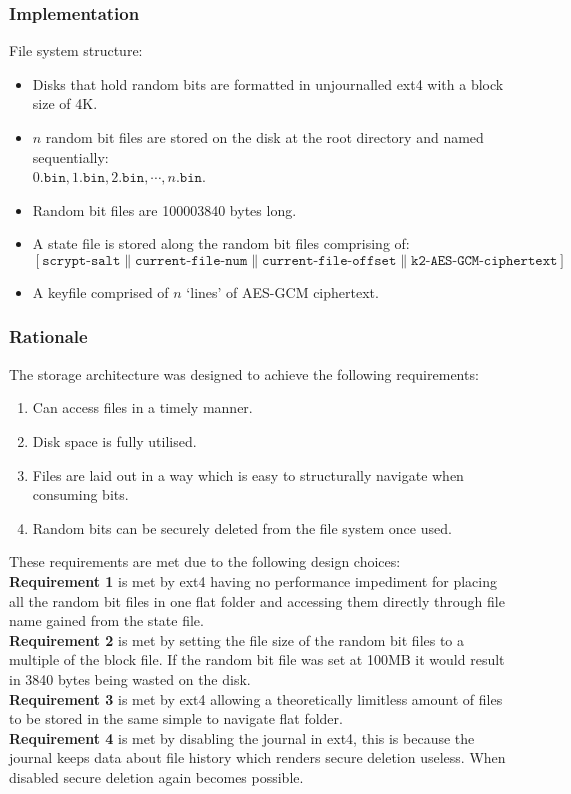 \documentclass{paper}
\begin{document}
				\subsubsection{Implementation}
					File system structure: \vspace{-0.75em}
					\begin{itemize}
					\setlength\itemsep{-0.3em}
					\item Disks that hold random bits are formatted in unjournalled ext4 with a block size of 4K.
					\item $n$ random bit files are stored on the disk at the root directory and named sequentially:\\
					$0.\texttt{bin}, 1.\texttt{bin}, 2.\texttt{bin}, \cdots , n.\texttt{bin}$.
					\item Random bit files are 100003840 bytes long.
					\item A state file is stored along the random bit files comprising of:\\ $\left[ \texttt{scrypt-salt}\parallel\texttt{current-file-num}\parallel\texttt{current-file-offset}\parallel\texttt{k2-AES-GCM-ciphertext}\right]$ 
					\item A keyfile comprised of $n$ `lines' of AES-GCM ciphertext.
					\end{itemize}
				\subsubsection{Rationale}
					The storage architecture was designed to achieve the following requirements: \vspace{-0.75em}
					\begin{enumerate}
					\setlength\itemsep{-0.3em}
					\item 	Can access files in a timely manner.
					\item 	Disk space is fully utilised.
					\item 	Files are laid out in a way which is easy to structurally navigate when consuming bits.
					\item 	Random bits can be securely deleted from the file system once used.
					\end{enumerate}
					These requirements are met due to the following design choices:\\
					\textbf{Requirement 1} is met by ext4 having no performance impediment for placing all the random bit files in one flat folder and accessing them directly through file name gained from the state file.\\
					\textbf{Requirement 2} is met by setting the file size of the random bit files to a multiple of the block file. If the random bit file was set at 100MB it would result in 3840 bytes being wasted on the disk.\\
					\textbf{Requirement 3} is met by ext4 allowing a theoretically limitless amount of files to be stored in the same simple to navigate flat folder.\\
					\textbf{Requirement 4} is met by disabling the journal in ext4, this is because the journal keeps data about file history which renders secure deletion useless. When disabled secure deletion again becomes possible.
\end{document}
